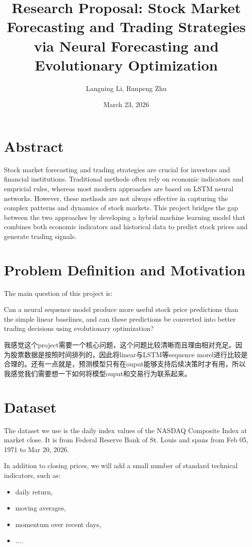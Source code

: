 \documentclass[12pt, a4paper]{article}
\title{Research Proposal: Stock Market Forecasting and Trading Strategies via Neural Forecasting and Evolutionary Optimization}
\author{Langning Li, Runpeng Zhu}
\date{March 23, 2026}
\begin{document}
\maketitle

\section{Abstract}
Stock market forecasting and trading strategies are crucial for investors and financial institutions. Traditional methods often rely on economic indicators and empricial rules, whereas most modern approaches are based on LSTM neural networks. However, these methods are not always effective in capturing the complex patterns and dynamics of stock markets. This project bridges the gap between the two approaches by developing a hybrid machine learning model that combines both economic indicators and historical data to predict stock prices and generate trading signals.

\section{Problem Definition and Motivation}
The main question of this project is:

Can a neural sequence model produce more useful stock price predictions than the simple linear baselines, and can these predictions be converted into better trading decisions using evolutionary optimization?

我感觉这个project需要一个核心问题，这个问题比较清晰而且理由相对充足。因为股票数据是按照时间排列的，因此将linear与LSTM等sequence morel进行比较是合理的。还有一点就是，预测模型只有在ouput能够支持后续决策时才有用，所以我感觉我们需要想一下如何将模型ouput和交易行为联系起来。

\section{Dataset}
The dataset we use is the daily index values of the NASDAQ Composite Index at market close. It is from Federal Reserve Bank of St. Louis and spans from Feb 05, 1971 to Mar 20, 2026.

In addition to closing prices, we will add a small number of standard technical indicators, such as:
\begin{itemize}
    \item daily return,
    \item moving averages,
    \item momentum over recent days,
    \item ....
\end{itemize}
\end{document}
